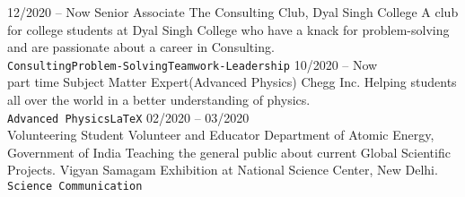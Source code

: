 \documentclass[9pt]{developercv} %
\begin{document}


\begin{entrylist}
	\entry
		{12/2020 -- Now}
		{Senior Associate}
		{The Consulting Club, Dyal Singh College}
		{A club for college students at Dyal Singh College who have a knack for problem-solving and are passionate about a career in Consulting.\\ 
		\texttt{Consulting}\slashsep\texttt{Problem-Solving}\slashsep\texttt{Teamwork-Leadership}}
	\entry
		{10/2020 -- Now\\\footnotesize{part time}}
		{Subject Matter Expert(Advanced Physics)}
		{Chegg Inc.}
		{Helping students all over the world in a better understanding of physics.\\ \texttt{Advanced Physics}\slashsep\texttt{LaTeX}}
	\entry
		{02/2020 -- 03/2020\\\footnotesize{Volunteering}}
		{Student Volunteer and Educator}
		{Department of Atomic Energy, Government of India}
		{Teaching the general public about current Global Scientific Projects. Vigyan Samagam Exhibition at National Science Center, New Delhi.\\ 
		\texttt{Science Communication}}
\end{entrylist}


\end{document}

